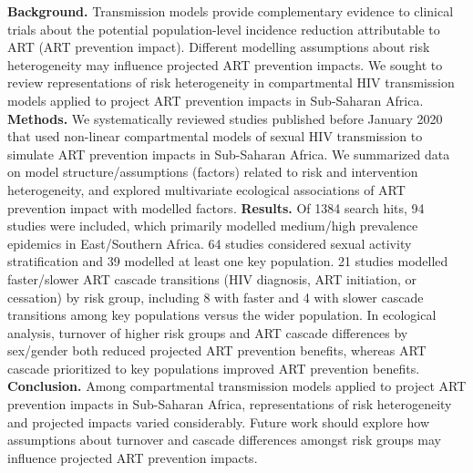 \textbf{Background.}
Transmission models provide complementary evidence to clinical trials about
the potential population-level incidence reduction attributable to ART (ART prevention impact).
Different modelling assumptions about risk heterogeneity may influence projected ART prevention impacts.
We sought to review representations of risk heterogeneity in compartmental HIV transmission models
applied to project ART prevention impacts in Sub-Saharan Africa.
\textbf{Methods.}
We systematically reviewed studies published before January 2020 that used
non-linear compartmental models of sexual HIV transmission
to simulate ART prevention impacts in Sub-Saharan Africa.
We summarized data on model structure/assumptions (factors) related to risk and intervention heterogeneity,
and explored multivariate ecological associations of ART prevention impact with modelled factors.
\textbf{Results.}
Of 1384 search hits, 94 studies were included,
which primarily modelled medium/high prevalence epidemics in East/Southern Africa.
64 studies considered sexual activity stratification and 39 modelled at least one key population.
21 studies modelled faster/slower ART cascade transitions (HIV diagnosis, ART initiation, or cessation) by risk group,
including 8 with faster and 4 with slower cascade transitions among key populations versus the wider population.
In ecological analysis, turnover of higher risk groups and ART cascade differences by sex/gender
both reduced projected ART prevention benefits, whereas
ART cascade prioritized to key populations improved ART prevention benefits.
\textbf{Conclusion.}
Among compartmental transmission models applied to project ART prevention impacts in Sub-Saharan Africa,
representations of risk heterogeneity and projected impacts varied considerably.
Future work should explore how assumptions about
turnover and cascade differences amongst risk groups
may influence projected ART prevention impacts.